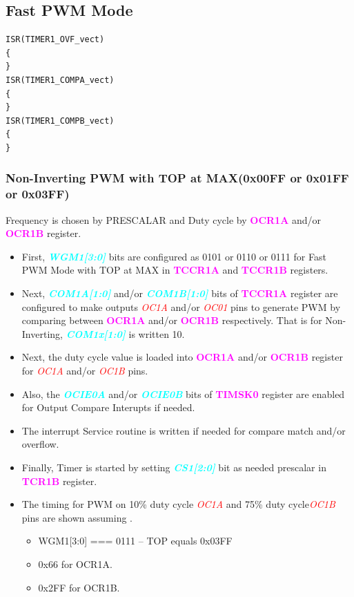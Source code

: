 \documentclass{article}
\newcommand{\bitFormat}[1]{\emph{\textbf{\textcolor{cyan}{#1}}}}
\newcommand{\regFormat}[1]{\textbf{\textcolor{magenta}{#1}}}
\newcommand{\pinFormat}[1]{\emph{\textcolor{red}{#1}}}
\begin{document}
\subsection{Fast PWM Mode}
\begin{verbatim}
ISR(TIMER1_OVF_vect)
{
} 
ISR(TIMER1_COMPA_vect)
{
}
ISR(TIMER1_COMPB_vect)
{
}
\end{verbatim}
\subsubsection{Non-Inverting PWM with TOP at MAX(0x00FF or 0x01FF or 0x03FF)}
\quad Frequency is chosen by PRESCALAR and Duty cycle by \regFormat{OCR1A} and/or \regFormat{OCR1B} register.
\begin{itemize}
    \item First, \bitFormat{WGM1[3:0]} bits are configured as 0101 or 0110 or 0111 for Fast PWM Mode with TOP at MAX in \regFormat{TCCR1A} and \regFormat{TCCR1B} registers.
    \item Next, \bitFormat{COM1A[1:0]} and/or \bitFormat{COM1B[1:0]} bits of \regFormat{TCCR1A} register are configured to make outputs \pinFormat{OC1A} and/or \pinFormat{OC01} pins to generate PWM by comparing between \regFormat{OCR1A} and/or \regFormat{OCR1B} respectively. That is for Non-Inverting, \bitFormat{COM1x[1:0]} is written 10.
    \item Next, the duty cycle value is loaded into \regFormat{OCR1A} and/or \regFormat{OCR1B} register for \pinFormat{OC1A} and/or \pinFormat{OC1B} pins.
    \item Also, the \bitFormat{OCIE0A} and/or \bitFormat{OCIE0B} bits of \regFormat{TIMSK0} register  are enabled for Output Compare Interupts if needed.
    \item The interrupt Service routine is written if needed for compare match and/or overflow.
    \item Finally, Timer is started by setting \bitFormat{CS1[2:0]} bit as needed prescalar in \regFormat{TCR1B} register.
    \item The timing for PWM on 10\% duty cycle \pinFormat{OC1A} and 75\% duty cycle\pinFormat{OC1B} pins are shown assuming .
    \begin{itemize}
        \item WGM1[3:0] === 0111 --	TOP equals 0x03FF
        \item 0x66 for OCR1A.
        \item 0x2FF for OCR1B.
    \end{itemize}
\end{itemize}
\end{document}
